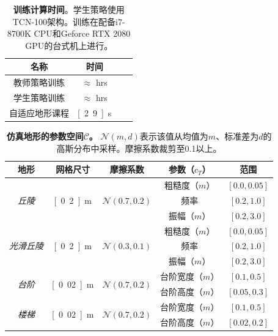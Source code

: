 \documentclass[9pt,twocolumn,twoside]{osajnl}
\begin{document}
\clearpage
\newpage

\begin{table}
\centering
 \begin{tabular}{|c|c|c|c|}
\hline
 名称 & 时间 \\ \hline
教师策略训练 & $\approx$ \unit[12]{hrs}  \\
学生策略训练 & $\approx$ \unit[4]{hrs} \\
自适应地形课程 & \unit[2.9]{s}   \\
\hline
\end{tabular}
\caption{\textbf{训练计算时间}。学生策略使用TCN-100架构。训练在配备i7-8700K CPU和Geforce RTX 2080 GPU的台式机上进行。} \label{tab:times}
\end{table}

\begin{table}
\centering
 \begin{tabular}{|c|c|c|c|c|}
\hline
地形 & 网格尺寸 & 摩擦系数 & 参数（$c_{T}$） & 范围 \\ \hline
\multirow{3}{*}{\textit{丘陵}} & \multirow{3}{*}{\unit[0.2]{m}}  & \multirow{3}{*}{ $\mathcal{N}(0.7, 0.2)$ }  & 粗糙度（$m$） & $[0.0, 0.05]$ \\
 & & & 频率 & $[0.2, 1.0]$ \\
 & & & 振幅（$m$） & $[0.2, 3.0]$ \\ \hline
 \multirow{3}{*}{\textit{光滑丘陵}} & \multirow{3}{*}{\unit[0.2]{m}}  & \multirow{3}{*}{$\mathcal{N}(0.3, 0.1)$ }  & 粗糙度（$m$） & $[0.0, 0.05]$ \\
 & & & 频率 & $[0.2, 1.0]$ \\
 & & & 振幅（$m$） & $[0.2, 3.0]$ \\ \hline
 \multirow{2}{*}{\textit{台阶}}  & \multirow{2}{*}{\unit[0.02]{m}}  & \multirow{2}{*}{$\mathcal{N}(0.7, 0.2)$}  & 台阶宽度（$m$） & $[0.1, 0.5]$ \\
& & & 台阶高度（$m$） & $[0.05, 0.3]$ \\ \hline
  \multirow{2}{*}{\textit{楼梯}}  & \multirow{2}{*}{\unit[0.02]{m}}  & \multirow{2}{*}{$\mathcal{N}(0.7, 0.2)$}  & 台阶宽度（$m$） & $[0.1, 0.5]$ \\
& & & 台阶高度（$m$） & $[0.02, 0.2]$ \\ \hline
\end{tabular}
\caption{\textbf{仿真地形的参数空间$\mathcal{C}$。} $\mathcal{N}(m, d)$表示该值从均值为$m$、标准差为$d$的高斯分布中采样。摩擦系数裁剪至0.1以上。} \label{tab:terrainparams}
\end{table}
\end{document}
